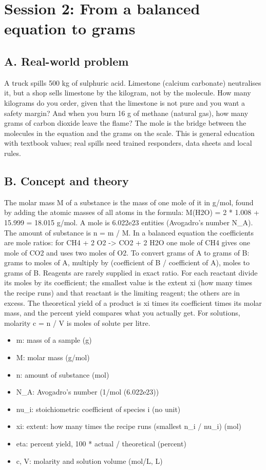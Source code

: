 \documentclass[11pt,a4paper]{article}
\begin{document}
\section{Session 2: From a balanced equation to grams}

\subsection*{A. Real-world problem}
A truck spills 500 kg of sulphuric acid. Limestone (calcium carbonate) neutralises it, but a shop sells limestone by the kilogram, not by the molecule. How many kilograms do you order, given that the limestone is not pure and you want a safety margin? And when you burn 16 g of methane (natural gas), how many grams of carbon dioxide leave the flame? The mole is the bridge between the molecules in the equation and the grams on the scale. This is general education with textbook values; real spills need trained responders, data sheets and local rules.

\subsection*{B. Concept and theory}
The molar mass M of a substance is the mass of one mole of it in g/mol, found by adding the atomic masses of all atoms in the formula: M(H2O) = 2 * 1.008 + 15.999 = 18.015 g/mol. A mole is 6.022e23 entities (Avogadro's number N\_A). The amount of substance is n = m / M. In a balanced equation the coefficients are mole ratios: for CH4 + 2 O2 -\textgreater{} CO2 + 2 H2O one mole of CH4 gives one mole of CO2 and uses two moles of O2. To convert grams of A to grams of B: grams to moles of A, multiply by (coefficient of B / coefficient of A), moles to grams of B. Reagents are rarely supplied in exact ratio. For each reactant divide its moles by its coefficient; the smallest value is the extent xi (how many times the recipe runs) and that reactant is the limiting reagent; the others are in excess. The theoretical yield of a product is xi times its coefficient times its molar mass, and the percent yield compares what you actually get. For solutions, molarity c = n / V is moles of solute per litre.

\begin{itemize}[nosep]
\item m: mass of a sample (g)
\item M: molar mass (g/mol)
\item n: amount of substance (mol)
\item N\_A: Avogadro's number (1/mol (6.022e23))
\item nu\_i: stoichiometric coefficient of species i (no unit)
\item xi: extent: how many times the recipe runs (smallest n\_i / nu\_i) (mol)
\item eta: percent yield, 100 * actual / theoretical (percent)
\item c, V: molarity and solution volume (mol/L, L)
\end{itemize}
\end{document}
